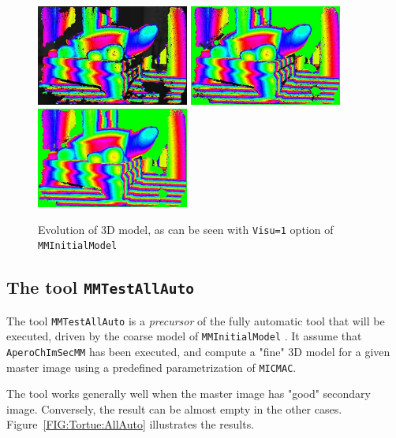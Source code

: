 \begin{figure}
\begin{center}
\includegraphics[width=50mm]{FIGS/Tortue/DumpMMTieP_6.jpg}
\includegraphics[width=50mm]{FIGS/Tortue/DumpMMTieP_7.jpg}
\includegraphics[width=50mm]{FIGS/Tortue/DumpMMTieP_8.jpg}
\end{center}
\caption{Evolution of 3D model, as can be seen with {\tt Visu=1} option 
of {\tt MMInitialModel}}
\label{FIG:Tortue:Dump}
\end{figure}



\subsection{The tool {\tt MMTestAllAuto}}

The tool {\tt MMTestAllAuto} is a \emph{precursor} of the fully automatic tool that will
be executed, driven by the coarse model of {\tt MMInitialModel} . It assume that  {\tt AperoChImSecMM} 
has been executed, and compute a "fine" 3D model for a given master image using a predefined parametrization
of {\tt MICMAC}.

The tool works generally well when the master image has "good" secondary image. Conversely, 
the  result can be almost empty in the other cases. Figure~\ref{FIG:Tortue:AllAuto} illustrates the
results.


